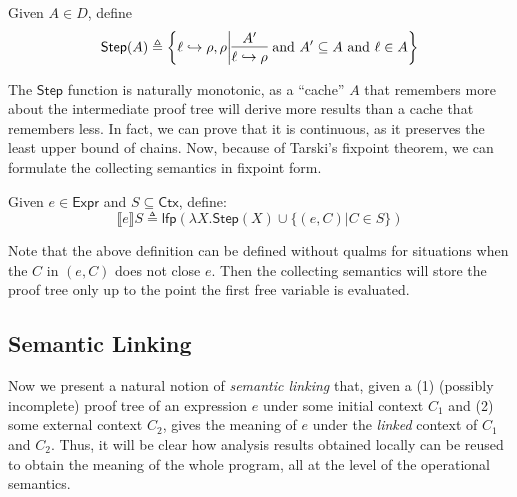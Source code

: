 \documentclass[acmsmall,screen,review]{acmart}\settopmatter{printfolios=true,printccs=false,printacmref=false}
\newcommand*{\Expr}{\mathsf{Expr}}
\newcommand*{\Ctx}{\mathsf{Ctx}}
\newcommand*{\lfp}{\mathsf{lfp}}
\newcommand*{\semarrow}{\hookrightarrow}
\newcommand*{\sembracket}[1]{\lBrack{#1}\rBrack}
\begin{document}
\begin{definition}
  Given $A\in D$, define
  \[
    \mathsf{Step}(A)\triangleq
    \left\{\ell\semarrow\rho, \rho\middle|
    \begin{prooftree}[center=true]
      \hypo{A'}\infer1{\ell\semarrow\rho}
    \end{prooftree}\text{ and }
    A'\subseteq A\text{ and }\ell\in A
    \right\}
  \]
\end{definition}

The $\mathsf{Step}$ function is naturally monotonic, as a ``cache'' $A$ that remembers more about the intermediate proof tree will derive more results than a cache that remembers less.
In fact, we can prove that it is continuous, as it preserves the least upper bound of chains.
Now, because of Tarski's fixpoint theorem, we can formulate the collecting semantics in fixpoint form.
\begin{definition}
  Given $e\in\Expr$ and $S\subseteq\Ctx$, define:
  \[
    \sembracket{e}S\triangleq\lfp(\lambda X.\mathsf{Step}(X)\cup\{(e,C)|C\in S\})
  \]
\end{definition}
Note that the above definition can be defined without qualms for situations when the $C$ in $(e,C)$ does not close $e$.
Then the collecting semantics will store the proof tree only up to the point the first free variable is evaluated.

\subsection{Semantic Linking}
Now we present a natural notion of \emph{semantic linking} that, given a (1) (possibly incomplete) proof tree of an expression $e$ under some initial context $C_1$ and (2) some external context $C_2$, gives the meaning of $e$ under the \emph{linked} context of $C_1$ and $C_2$.
Thus, it will be clear how analysis results obtained locally can be reused to obtain the meaning of the whole program, all at the level of the operational semantics.
\end{document}
